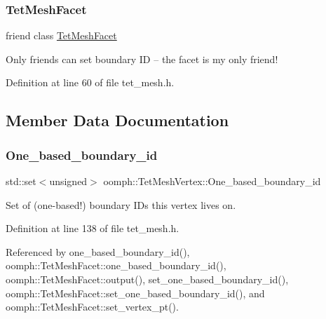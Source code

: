 \subsubsection{\texorpdfstring{Tet\+Mesh\+Facet}{TetMeshFacet}}
{\footnotesize\ttfamily friend class \hyperlink{classoomph_1_1TetMeshFacet}{Tet\+Mesh\+Facet}\hspace{0.3cm}{\ttfamily [friend]}}



Only friends can set boundary ID -- the facet is my only friend! 



Definition at line 60 of file tet\+\_\+mesh.\+h.



\subsection{Member Data Documentation}
\mbox{\label{classoomph_1_1TetMeshVertex_a7bbd3bde4360f101314b6059abeecd8b}} 
\subsubsection{\texorpdfstring{One\+\_\+based\+\_\+boundary\+\_\+id}{One\_based\_boundary\_id}}
{\footnotesize\ttfamily std\+::set$<$unsigned$>$ oomph\+::\+Tet\+Mesh\+Vertex\+::\+One\+\_\+based\+\_\+boundary\+\_\+id\hspace{0.3cm}{\ttfamily [private]}}



Set of (one-\/based!) boundary I\+Ds this vertex lives on. 



Definition at line 138 of file tet\+\_\+mesh.\+h.



Referenced by one\+\_\+based\+\_\+boundary\+\_\+id(), oomph\+::\+Tet\+Mesh\+Facet\+::one\+\_\+based\+\_\+boundary\+\_\+id(), oomph\+::\+Tet\+Mesh\+Facet\+::output(), set\+\_\+one\+\_\+based\+\_\+boundary\+\_\+id(), oomph\+::\+Tet\+Mesh\+Facet\+::set\+\_\+one\+\_\+based\+\_\+boundary\+\_\+id(), and oomph\+::\+Tet\+Mesh\+Facet\+::set\+\_\+vertex\+\_\+pt().

